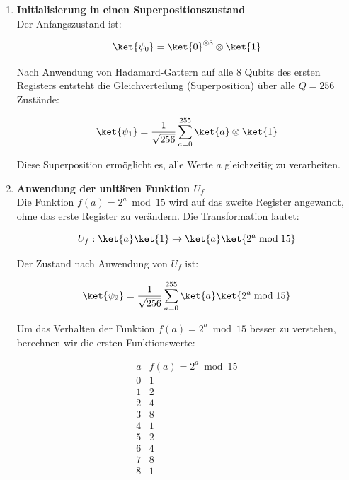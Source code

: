 \begin{enumerate}
    \item \textbf{Initialisierung in einen Superpositionszustand} \\
    Der Anfangszustand ist:

    \[
    \ket{\psi_0} = \ket{0}^{\otimes 8} \otimes \ket{1}
    \]

    Nach Anwendung von Hadamard-Gattern auf alle 8 Qubits des ersten Registers entsteht die Gleichverteilung (Superposition) über alle \( Q = 256 \) Zustände:

    \[
    \ket{\psi_1} = \frac{1}{\sqrt{256}} \sum_{a=0}^{255} \ket{a} \otimes \ket{1}
    \]

    Diese Superposition ermöglicht es, alle Werte \( a \) gleichzeitig zu verarbeiten.\\

    \item \textbf{Anwendung der unitären Funktion \( U_f \)} \\

    Die Funktion \( f(a) = 2^a \bmod 15 \) wird auf das zweite Register angewandt, ohne das erste Register zu verändern. Die Transformation lautet:

    \[
    U_f: \ket{a} \ket{1} \mapsto \ket{a} \ket{2^a \bmod 15}
    \]

    Der Zustand nach Anwendung von \( U_f \) ist:

    \[
    \ket{\psi_2} = \frac{1}{\sqrt{256}} \sum_{a=0}^{255} \ket{a} \ket{2^a \bmod 15}
    \]

    Um das Verhalten der Funktion \( f(a) = 2^a \bmod 15 \) besser zu verstehen, berechnen wir die ersten Funktionswerte:

    \[
    \begin{array}{c|c}
    a & f(a) = 2^a \bmod 15 \\
    \hline
    0 & 1 \\
    1 & 2 \\
    2 & 4 \\
    3 & 8 \\
    4 & 1 \\
    5 & 2 \\
    6 & 4 \\
    7 & 8 \\
    8 & 1 \\
    \end{array}
    \]


\end{enumerate}
